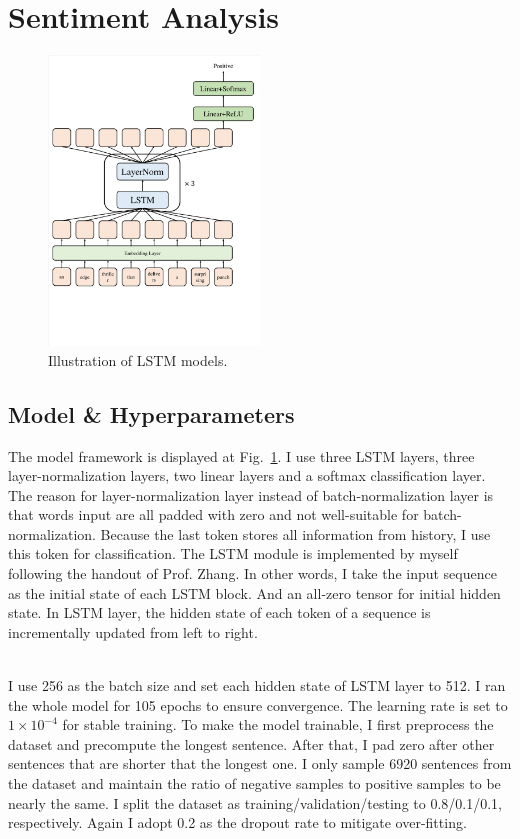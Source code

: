 
\section{Sentiment Analysis}
\begin{figure}[htbp]
    \centering
    \includegraphics[width=0.5\textwidth]{lstm_model.pdf}
    \caption{Illustration of LSTM models.}
    \label{fig:lstm_model}
\end{figure}
\subsection{Model \& Hyperparameters}
The model framework is displayed at Fig.~\ref{fig:lstm_model}. I use three LSTM layers, three layer-normalization layers, two linear layers and a softmax classification layer. 
The reason for layer-normalization layer instead of batch-normalization layer is that words input are all padded with zero and not well-suitable for batch-normalization.
Because the last token stores all information from history, I use this token for classification.
The LSTM module is implemented by myself following the handout of Prof. Zhang.
In other words, I take the input sequence as the initial state of each LSTM block. And an all-zero tensor for initial hidden state.
In LSTM layer, the hidden state of each token of a sequence is incrementally updated from left to right.

\hspace*{\fill} \\
\noindent
I use 256 as the batch size and set each hidden state of LSTM layer to 512.
I ran the whole model for 105 epochs to ensure convergence.
The learning rate is set to $1\times 10^{-4}$ for stable training.
To make the model trainable, I first preprocess the dataset and precompute the longest sentence.
After that, I pad zero after other sentences that are shorter that the longest one.
I only sample 6920 sentences from the dataset and maintain the ratio of negative samples to positive samples to be nearly the same.
I split the dataset as training/validation/testing to 0.8/0.1/0.1, respectively.
Again I adopt 0.2 as the dropout rate to mitigate over-fitting.

